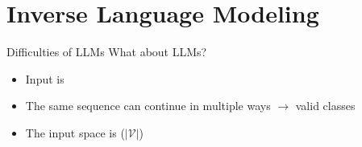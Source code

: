\section{Inverse Language Modeling}

\begin{frame}{Difficulties of LLMs}
    What about LLMs?

    \begin{itemize}
        \item Input is 
        \item The same sequence can continue in multiple ways $\rightarrow$  valid classes
        \item The input space is  ($|\mathcal{V}|$)
    \end{itemize}
\end{frame}

